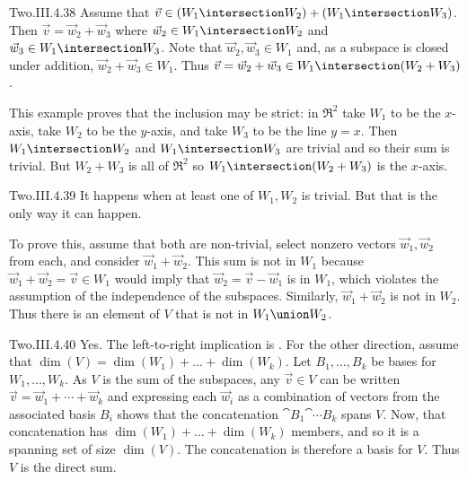 \begin{ans}{Two.III.4.38}
      Assume that
      \( \vec{v}\in (W_1\intersection W_2)+(W_1\intersection W_3) \).
      Then \( \vec{v}=\vec{w}_2+\vec{w}_3 \) where
      \( \vec{w}_2\in W_1\intersection W_2 \) and
      \( \vec{w}_3\in W_1\intersection W_3 \).
      Note that \( \vec{w}_2,\vec{w}_3\in W_1 \) and, as a subspace is closed
      under addition, \( \vec{w}_2+\vec{w}_3\in W_1 \).
      Thus \( \vec{v}=\vec{w}_2+\vec{w}_3\in W_1\intersection(W_2+W_3) \).

      This example proves that the inclusion may be strict:
      in \( \Re^2 \) take \( W_1 \) to be the \( x \)-axis, take \( W_2 \)
      to be the \( y \)-axis, and take \( W_3 \) to be the line \( y=x \).
      Then \( W_1\intersection W_2 \) and \( W_1\intersection W_3 \) are
      trivial and so their sum is trivial.
      But \( W_2+W_3 \) is all of \( \Re^2 \) so
      \( W_1\intersection(W_2+W_3) \) is the \( x \)-axis.
     
\end{ans}
\begin{ans}{Two.III.4.39}
      It happens when at least one of \( W_1,W_2 \) is trivial.
      But that is the only way it can happen.

      To prove this, assume that both are non-trivial,
      select nonzero vectors \( \vec{w}_1, \vec{w}_2 \) from each,
      and consider \( \vec{w}_1+\vec{w}_2 \).
      This sum is not in \( W_1 \) because
      \( \vec{w}_1+\vec{w}_2=\vec{v}\in W_1 \) would imply that
      \( \vec{w}_2=\vec{v}-\vec{w}_1 \) is in \( W_1 \),
      which violates the assumption of the independence of the subspaces.
      Similarly, \( \vec{w}_1+\vec{w}_2 \) is not in \( W_2 \).
      Thus there is an element of \( V \) that is not in \( W_1\union W_2 \).
     
\end{ans}
\begin{ans}{Two.III.4.40}
      Yes.
      The left-to-right implication is
      .
      For the other direction,
      assume that \( \dim(V)=\dim(W_1)+\dots+\dim(W_k) \).
      Let \( B_1,\dots, B_k \) be bases for \( W_1,\dots, W_k \).
      As $V$ is the sum of the subspaces, any \( \vec{v}\in V \) can be written
      \( \vec{v}=\vec{w}_1+\cdots+\vec{w}_k \) and expressing each
      \( \vec{w}_i \) as a combination of vectors from the associated
      basis \( B_i \) shows that the concatenation
      \( \cat{B_1}{\cat{\cdots}{B_k}}  \) spans \( V \).
      Now, that concatenation has
      \( \dim(W_1)+\dots+\dim(W_k) \) members, and so it is a spanning set of
      size \( \dim(V) \).
      The concatenation is therefore a basis for \( V \).
      Thus \( V \) is the direct sum.
     
\end{ans}

